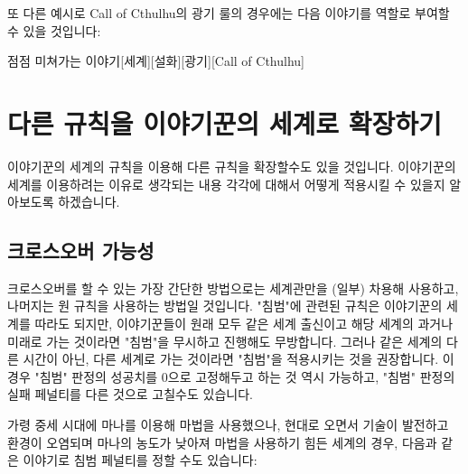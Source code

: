 \documentclass{report}
\begin{document}
	\fi
	
	\ifDLC
	\medskip
	
	또 다른 예시로 Call of Cthulhu의 광기 룰의 경우에는 다음 이야기를 역할로 부여할 수 있을 것입니다:
	\begin{story}{점점 미쳐가는 이야기}{[세계][설화][광기][Call of Cthulhu]}
		
	\end{story}
	\fi
	
	\section*{다른 규칙을 이야기꾼의 세계로 확장하기}
	이야기꾼의 세계의 규칙을 이용해 다른 규칙을 확장할수도 있을 것입니다. 이야기꾼의 세계를 이용하려는 이유로 생각되는 내용 각각에 대해서 어떻게 적용시킬 수 있을지 알아보도록 하겠습니다.
	
	\subsection*{크로스오버 가능성}
	크로스오버를 할 수 있는 가장 간단한 방법으로는 세계관만을 (일부) 차용해 사용하고, 나머지는 원 규칙을 사용하는 방법일 것입니다. "침범"에 관련된 규칙은 이야기꾼의 세계를 따라도 되지만, 이야기꾼들이 원래 모두 같은 세계 출신이고 해당 세계의 과거나 미래로 가는 것이라면 "침범"을 무시하고 진행해도 무방합니다. 그러나 같은 세계의 다른 시간이 아닌, 다른 세계로 가는 것이라면 "침범"을 적용시키는 것을 권장합니다. 이 경우 "침범" 판정의 성공치를 0으로 고정해두고 하는 것 역시 가능하고, "침범" 판정의 실패 페널티를 다른 것으로 고칠수도 있습니다.
	
	가령 중세 시대에 마나를 이용해 마법을 사용했으나, 현대로 오면서 기술이 발전하고 환경이 오염되며 마나의 농도가 낮아져 마법을 사용하기 힘든 세계의 경우, 다음과 같은 이야기로 침범 페널티를 정할 수도 있습니다:
	
\end{document}
